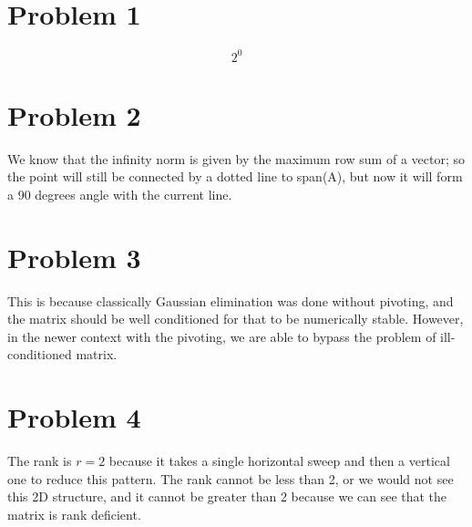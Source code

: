 \documentclass{article}
\begin{document}
\section{Problem 1}
\begin{equation}
    2^0
\end{equation}
\section{Problem 2}
We know that the infinity norm is given by the maximum row sum of a vector; so the point will still be connected by a dotted line to span(A), but now it will form a 90 degrees angle with the current line.
\section{Problem 3}
This is because classically Gaussian elimination was done without pivoting, and the matrix should be well conditioned for that to be numerically stable. However, in the newer context with the pivoting, we are able to bypass the problem of ill-conditioned matrix.
\section{Problem 4}
The rank is $r=2$ because it takes a single horizontal sweep and then a vertical one to reduce this pattern. The rank cannot be less than 2, or we would not see this 2D structure, and it cannot be greater than 2 because we can see that the matrix is rank deficient.
\end{document}
